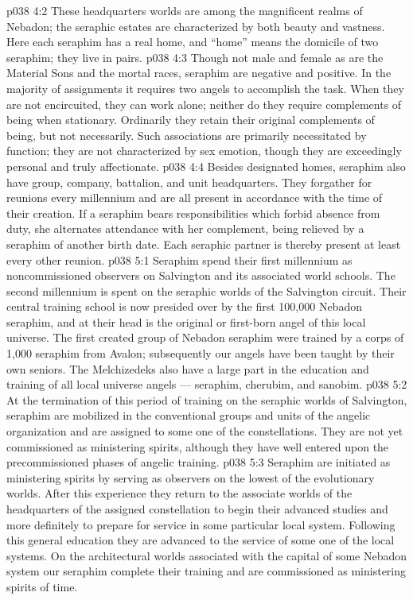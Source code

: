 \vs p038 4:2 These headquarters worlds are among the magnificent realms of Nebadon; the seraphic estates are characterized by both beauty and vastness. Here each seraphim has a real home, and “home” means the domicile of two seraphim; they live in pairs.
\vs p038 4:3 \pc Though not male and female as are the Material Sons and the mortal races, seraphim are negative and positive. In the majority of assignments it requires two angels to accomplish the task. When they are not encircuited, they can work alone; neither do they require complements of being when stationary. Ordinarily they retain their original complements of being, but not necessarily. Such associations are primarily necessitated by function; they are not characterized by sex emotion, though they are exceedingly personal and truly affectionate.
\vs p038 4:4 Besides designated homes, seraphim also have group, company, battalion, and unit headquarters. They forgather for reunions every millennium and are all present in accordance with the time of their creation. If a seraphim bears responsibilities which forbid absence from duty, she alternates attendance with her complement, being relieved by a seraphim of another birth date. Each seraphic partner is thereby present at least every other reunion.
\vs p038 5:1 Seraphim spend their first millennium as noncommissioned observers on Salvington and its associated world schools. The second millennium is spent on the seraphic worlds of the Salvington circuit. Their central training school is now presided over by the first 100,000 Nebadon seraphim, and at their head is the original or first\hyp{}born angel of this local universe. The first created group of Nebadon seraphim were trained by a corps of 1,000 seraphim from Avalon; subsequently our angels have been taught by their own seniors. The Melchizedeks also have a large part in the education and training of all local universe angels --- seraphim, cherubim, and sanobim.
\vs p038 5:2 At the termination of this period of training on the seraphic worlds of Salvington, seraphim are mobilized in the conventional groups and units of the angelic organization and are assigned to some one of the constellations. They are not yet commissioned as ministering spirits, although they have well entered upon the precommissioned phases of angelic training.
\vs p038 5:3 Seraphim are initiated as ministering spirits by serving as observers on the lowest of the evolutionary worlds. After this experience they return to the associate worlds of the headquarters of the assigned constellation to begin their advanced studies and more definitely to prepare for service in some particular local system. Following this general education they are advanced to the service of some one of the local systems. On the architectural worlds associated with the capital of some Nebadon system our seraphim complete their training and are commissioned as ministering spirits of time.
